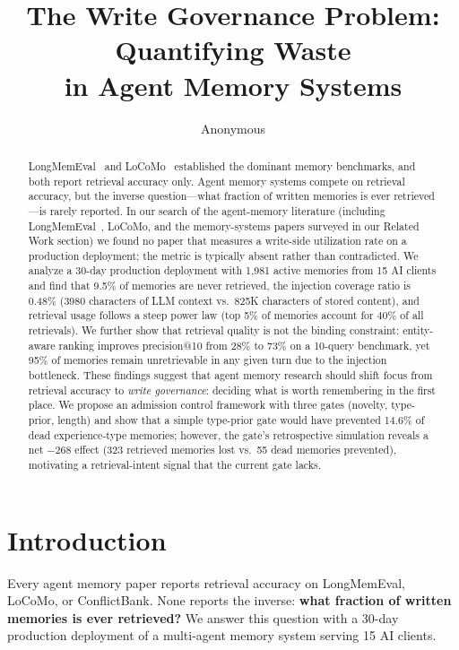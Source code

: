 \documentclass[10pt,twocolumn]{article}
\title{The Write Governance Problem: Quantifying Waste\\
in Agent Memory Systems}
\author{Anonymous}
\date{}
\begin{document}
\maketitle

\begin{abstract}
LongMemEval~\cite{wu2024longmemeval} and LoCoMo~\cite{locomo2024} established the dominant
memory benchmarks, and both report retrieval accuracy only. Agent memory systems compete on
retrieval accuracy, but the inverse question---what fraction of written memories is ever retrieved---is rarely reported. In our search of the agent-memory literature (including LongMemEval~\cite{wu2024longmemeval}, LoCoMo, and the memory-systems papers surveyed in our Related Work section) we found no paper that measures a write-side utilization rate on a production deployment; the metric is typically absent rather than contradicted. We analyze a 30-day production deployment with 1,981 active memories from 15 AI clients and find that 9.5\% of memories are never retrieved, the injection coverage ratio is 0.48\% (3980 characters of LLM context vs.\ 825K characters of stored content), and retrieval usage follows a steep power law (top 5\% of memories account for 40\% of all retrievals). We further show that retrieval quality is not the binding constraint: entity-aware ranking improves precision@10 from 28\% to 73\% on a 10-query benchmark, yet 95\% of memories remain unretrievable in any given turn due to the injection bottleneck. These findings suggest that agent memory research should shift focus from retrieval accuracy to \emph{write governance}: deciding what is worth remembering in the first place. We propose an admission control framework with three gates (novelty, type-prior, length) and show that a simple type-prior gate would have prevented 14.6\% of dead experience-type memories; however, the gate's retrospective simulation reveals a net $-268$ effect (323 retrieved memories lost vs.\ 55 dead memories prevented), motivating a retrieval-intent signal that the current gate lacks.
\end{abstract}

\section{Introduction}

Every agent memory paper reports retrieval accuracy on LongMemEval, LoCoMo, or ConflictBank. None reports the inverse: \textbf{what fraction of written memories is ever retrieved?} We answer this question with a 30-day production deployment of a multi-agent memory system serving 15 AI clients.
\end{document}

